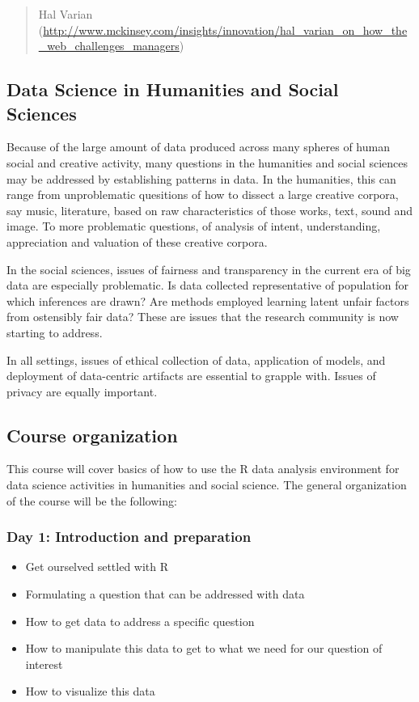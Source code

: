 \documentclass[]{article}
\theoremstyle{definition}
\theoremstyle{definition}
\theoremstyle{remark}
\begin{document}
\begin{quote}
Hal Varian
(\url{http://www.mckinsey.com/insights/innovation/hal_varian_on_how_the_web_challenges_managers})
\end{quote}

\subsection{Data Science in Humanities and Social
Sciences}\label{data-science-in-humanities-and-social-sciences}

Because of the large amount of data produced across many spheres of
human social and creative activity, many questions in the humanities and
social sciences may be addressed by establishing patterns in data. In
the humanities, this can range from unproblematic quesitions of how to
dissect a large creative corpora, say music, literature, based on raw
characteristics of those works, text, sound and image. To more
problematic questions, of analysis of intent, understanding,
appreciation and valuation of these creative corpora.

In the social sciences, issues of fairness and transparency in the
current era of big data are especially problematic. Is data collected
representative of population for which inferences are drawn? Are methods
employed learning latent unfair factors from ostensibly fair data? These
are issues that the research community is now starting to address.

In all settings, issues of ethical collection of data, application of
models, and deployment of data-centric artifacts are essential to
grapple with. Issues of privacy are equally important.

\subsection{Course organization}\label{course-organization}

This course will cover basics of how to use the R data analysis
environment for data science activities in humanities and social
science. The general organization of the course will be the following:

\subsubsection{Day 1: Introduction and
preparation}\label{day-1-introduction-and-preparation}

\begin{itemize}
\itemsep1pt\parskip0pt
\item
  Get ourselved settled with R
\item
  Formulating a question that can be addressed with data
\item
  How to get data to address a specific question
\item
  How to manipulate this data to get to what we need for our question of
  interest
\item
  How to visualize this data
\end{itemize}
\end{document}
